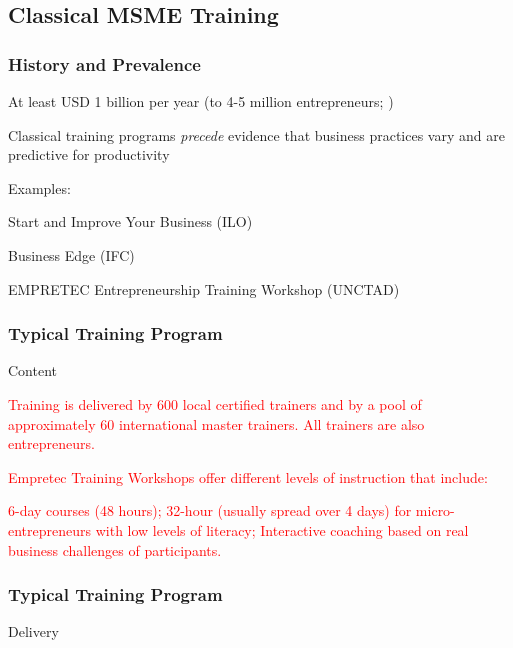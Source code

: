 \documentclass[hideothersubsections, usenames,dvipsnames,11pt]{beamer}
\newenvironment{itemize_2pt}{\itemize\addtolength{\itemsep}{2pt}}{\enditemize}
\begin{document}
\subsection{Classical MSME Training}

\begin{frame}
\frametitle{History and Prevalence}
	\begin{itemize_2pt}
		\item At least \textcolor{bdf}{USD 1 billion per year} (to 4-5 million entrepreneurs; \citet{McKenzie2020})
		\item Classical training programs \emph{precede} evidence that business practices vary and are predictive for productivity
		
		\vspace{0.5em}		
		
		\item Examples:
		\begin{itemize_2pt}
			\item Start and Improve Your Business (ILO)
			\item Business Edge (IFC)
			\item EMPRETEC Entrepreneurship Training Workshop (UNCTAD)
		\end{itemize_2pt} 
	\end{itemize_2pt}
\end{frame}


\begin{frame}
\frametitle{Typical Training Program}
	Content
	\begin{itemize_2pt}
	\item \textcolor{red}{Training is delivered by 600 local certified trainers and by a pool of approximately 60 international master trainers. All trainers are also entrepreneurs.
	\item Empretec Training Workshops offer different levels of instruction that include:
	\item 6-day courses (48 hours); 32-hour (usually spread over 4 days) for micro-entrepreneurs with low levels of literacy; Interactive coaching based on real business challenges of participants.}
	\end{itemize_2pt}
\end{frame}

\begin{frame}
\frametitle{Typical Training Program}
	Delivery 
	\begin{itemize_2pt}
	\item %
	\vspace{0.1in}
	\end{itemize_2pt}
\end{frame}
\end{document}
